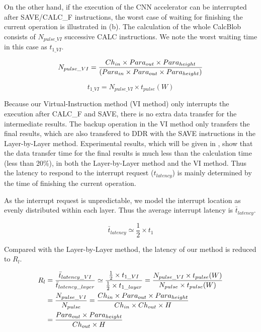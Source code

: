 On the other hand, if the execution of the CNN accelerator can be interrupted after SAVE/CALC\_F instructions, the worst case of waiting for finishing the current operation is illustrated in (b). The calculation of the whole CalcBlob consists of $N_{pulse\_VI}$ successive CALC instructions. We note the worst waiting time in this case as $t_{1\_VI}$.

\begin{equation}
	\small
	N_{pulse\_VI} = \frac{ Ch_{in} \times Para_{out} \times Para_{height} }{ (Para_{in} \times Para_{out} \times Para_{height}) } 
\end{equation}

\begin{equation}
t_{1\_VI} = N_{pulse\_VI} \times t_{pulse}(W)
\end{equation}


Because our Virtual-Instruction method (VI method) only interrupts the execution after CALC\_F and SAVE, there is no extra data transfer for the intermediate results. The backup operation in the VI method only transfers the final results, which are also transfered to DDR with the SAVE instructions in the Layer-by-Layer method. 
Experimental results, which will be given in , show that the data transfer time for the final results is much less than the calculation time (less than 20\%), in both the Layer-by-Layer method and the VI method. Thus the latency to respond to the interrupt request ($t_{latency}$) is mainly determined by the time of finishing the current operation.

As the interrupt request is unpredictable, we model the interrupt location as evenly distributed within each layer. Thus the average interrupt latency is $\bar{t}_{latency} $.

\begin{equation}
	\bar{t}_{latency}  \simeq \frac{1}{2} \times t_{1}
\end{equation}

Compared with the Layer-by-Layer method, the latency of our method is reduced to $R_l$.

\begin{equation}
	\small
	\begin{split}
	R_l & =  \frac{\bar{t}_{latency\_VI}}{\bar{t}_{latency\_layer}} \simeq \frac{\frac{1}{2} \times t_{1\_VI}}{\frac{1}{2} \times t_{1\_layer}}  = \frac{ N_{pulse\_VI} \times t_{pulse}(W) }{ N_{pulse} \times t_{pulse}(W) }  \\
		   & = \frac{ N_{pulse\_VI} }{N_{pulse} } = \frac{ Ch_{in} \times Para_{out} \times Para_{height}  }{  Ch_{in} \times Ch_{out} \times H } \\
		   & = \frac{ Para_{out} \times Para_{height} }{ Ch_{out} \times H} 
	\end{split}
\end{equation}

